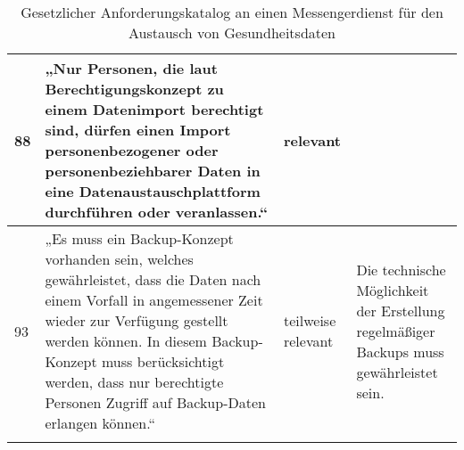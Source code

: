 \begin{longtable}{p{0.6cm}|p{6cm}|p{2cm}|p{6cm}}
    88     & „Nur Personen, die laut Berechtigungskonzept zu einem Datenimport berechtigt sind, dürfen einen Import personenbezogener oder personenbeziehbarer Daten in eine Datenaustauschplattform durchführen oder veranlassen.“                                                                               & relevant           &                                                                                                                                                                                                                                                                                                                                                                                                                                                                                                                                                                     \\ \hline
    93     & „Es muss ein Backup-Konzept vorhanden sein, welches gewährleistet, dass die Daten nach einem Vorfall in angemessener Zeit wieder zur Verfügung gestellt werden können. In diesem Backup-Konzept muss berücksichtigt werden, dass nur berechtigte Personen Zugriff auf Backup-Daten erlangen können.“ & teilweise relevant & Die technische Möglichkeit der Erstellung regelmäßiger Backups muss gewährleistet sein.                                                                                                                                                                                                                                                                                                                                                                                                                                                                             \\ \hline
\caption{Gesetzlicher Anforderungskatalog an einen Messengerdienst für den Austausch von Gesundheitsdaten}    
\end{longtable}
\newpage
{}

